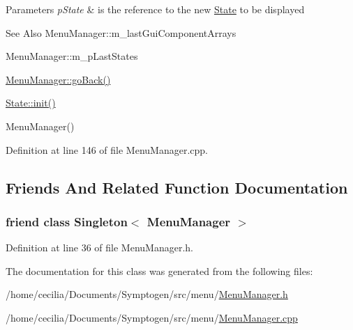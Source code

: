 \begin{DoxyParams}{Parameters}
{\em p\-State} & is the reference to the new \hyperlink{class_symp_1_1_state}{State} to be displayed \\
\hline
\end{DoxyParams}
\begin{DoxySeeAlso}{See Also}
Menu\-Manager\-::m\-\_\-last\-Gui\-Component\-Arrays 

Menu\-Manager\-::m\-\_\-p\-Last\-States 

\hyperlink{class_symp_1_1_menu_manager_ad91c22c5324edaf941b4a8d4c13bc3f6}{Menu\-Manager\-::go\-Back()} 

\hyperlink{class_symp_1_1_state_a2c1c597b1235128a356c7529c42fdec3}{State\-::init()} 

Menu\-Manager() 
\end{DoxySeeAlso}


Definition at line 146 of file Menu\-Manager.\-cpp.



\subsection{Friends And Related Function Documentation}
\hypertarget{class_symp_1_1_menu_manager_a604424b0d8b0846c826e4e8122ba2f46}{
\subsubsection[{Singleton$<$ Menu\-Manager $>$}]{\setlength{\rightskip}{0pt plus 5cm}friend class {\bf Singleton}$<$ {\bf Menu\-Manager} $>$\hspace{0.3cm}{\ttfamily [friend]}}}\label{class_symp_1_1_menu_manager_a604424b0d8b0846c826e4e8122ba2f46}


Definition at line 36 of file Menu\-Manager.\-h.



The documentation for this class was generated from the following files\-:\begin{DoxyCompactItemize}
\item 
/home/cecilia/\-Documents/\-Symptogen/src/menu/\hyperlink{_menu_manager_8h}{Menu\-Manager.\-h}\item 
/home/cecilia/\-Documents/\-Symptogen/src/menu/\hyperlink{_menu_manager_8cpp}{Menu\-Manager.\-cpp}\end{DoxyCompactItemize}

